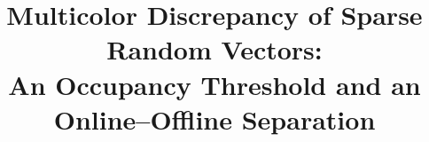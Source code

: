 \documentclass[11pt]{article}
\title{Multicolor Discrepancy of Sparse Random Vectors:\\
An Occupancy Threshold and an Online--Offline Separation}
\date{}
\theoremstyle{plain}
\theoremstyle{definition}
\begin{document}
\maketitle

\begin{abstract}

\end{abstract}





\appendix
\end{document}
